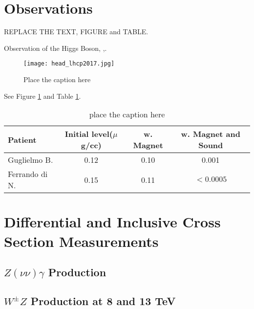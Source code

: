 \documentclass[10pt]{article}
\begin{document}
\section{Observations}

REPLACE THE TEXT, FIGURE and TABLE.

Observation of the Higgs Boson,  \cite{Aad:2012tfa},\cite{Chatrchyan:2012ufa}. 

 
\begin{figure}[htb]
\centering
\texttt{[image: head\_lhcp2017.jpg]}
\caption{ Place the caption here}
\label{fig:figure1}
\end{figure}

See Figure \ref{fig:figure1} and Table \ref{tab:table1}. 

\begin{table}[t]
\begin{center}
\begin{tabular}{l|ccc}  
Patient &  Initial level($\mu$g/cc) &  w. Magnet &  
w. Magnet and Sound \\ \hline
 Guglielmo B.  &   0.12     &     0.10      &     0.001  \\
 Ferrando di N. &  0.15     &     0.11      &  $< 0.0005$ \\ \hline
\end{tabular}
\caption{ place the caption here }
\label{tab:table1}
\end{center}
\end{table}
\section{Differential and Inclusive Cross Section Measurements}

\subsection{$Z(\nu\nu)\gamma$ Production}

\subsection{$W^{\pm}Z$ Production at 8 and 13 TeV}
\end{document}
